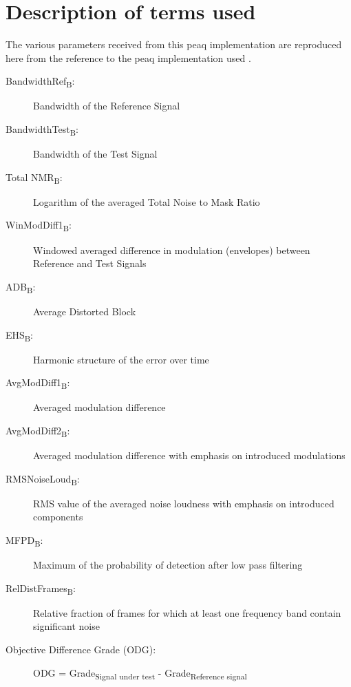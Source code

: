 \section{Description of terms used}
The various parameters received from this \gls{peaq} implementation are reproduced here from the reference to the \gls{peaq} implementation used \cite{Campeanu2005}.
\begin{description}
\item[BandwidthRef\textsubscript{B}:] Bandwidth of the Reference Signal
\item[BandwidthTest\textsubscript{B}:] Bandwidth of the Test Signal
\item[Total NMR\textsubscript{B}:] Logarithm of the averaged Total Noise to Mask Ratio
\item[WinModDiff1\textsubscript{B}:] Windowed averaged difference in modulation (envelopes) between Reference and Test Signals
\item[ADB\textsubscript{B}:] Average Distorted Block
\item[EHS\textsubscript{B}:] Harmonic structure of the error over time
\item[AvgModDiff1\textsubscript{B}:] Averaged modulation difference
\item[AvgModDiff2\textsubscript{B}:] Averaged modulation difference with emphasis on introduced modulations
\item[RMSNoiseLoud\textsubscript{B}:] RMS value of the averaged noise loudness with emphasis on introduced components
\item[MFPD\textsubscript{B}:] Maximum of the probability of detection after low pass filtering
\item[RelDistFrames\textsubscript{B}:] Relative fraction of frames for which at least one frequency band contain significant noise
\item[Objective Difference Grade (ODG):] ODG = Grade\textsubscript{Signal under test} - Grade\textsubscript{Reference signal}
\end{description}



